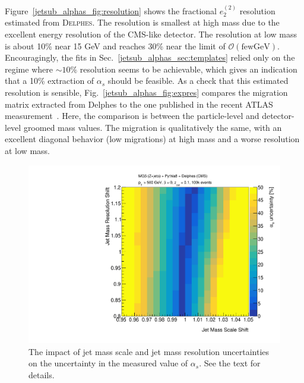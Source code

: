 \documentclass[11pt]{cernrep}
\begin{document}
Figure~\ref{jetsub_alphas_fig:resolution} shows the fractional $e_2^{(2)}$ resolution estimated from \textsc{Delphes}.
%
The resolution is smallest at high mass due to the excellent energy resolution of the CMS-like detector.
%
The resolution at low mass is about 10\% near 15 GeV and reaches 30\% near the limit of $\mathcal{O}(\mathrm{few GeV})$.
%
Encouragingly, the fits in Sec.~\ref{jetsub_alphas_sec:templates} relied only on the regime where $\sim 10\%$ resolution seems to be achievable, which gives an indication that a 10\% extraction of $\alpha_s$ should be feasible.
%
As a check that this estimated resolution is sensible, Fig.~\ref{jetsub_alphas_fig:expres} compares the migration matrix extracted from Delphes to the one published in the recent ATLAS measurement~\cite{Aaboud:2017qwh}.
%
Here, the comparison is between the particle-level and detector-level groomed mass values. 
%
The migration is qualitatively the same, with an excellent diagonal behavior (low migrations) at high mass and a worse resolution at low mass.






\begin{figure}[t]
\begin{center}
\includegraphics[width = 0.49\columnwidth]{jetsub_alphas_resolution_scan.pdf}
\end{center}
\caption{The impact of jet mass scale and jet mass resolution uncertainties on the uncertainty in the measured value of $\alpha_s$.  See the text for details.}
\label{jetsub_alphas_fig:expfit}
\end{figure}
\end{document}
